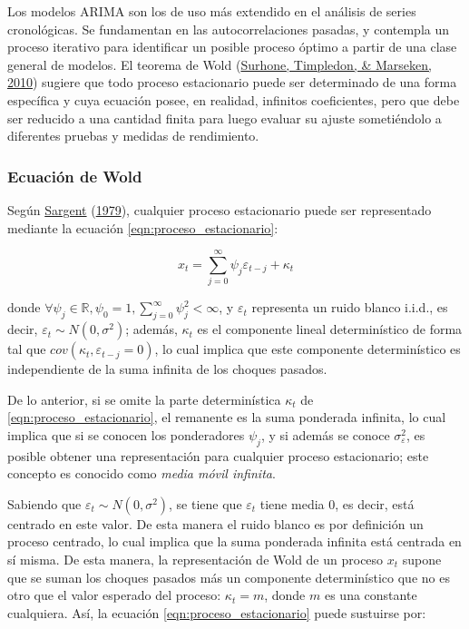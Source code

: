 \documentclass[
]{article}
\begin{document}
Los modelos ARIMA son los de uso más extendido en el análisis de series
cronológicas. Se fundamentan en las autocorrelaciones pasadas, y
contempla un proceso iterativo para identificar un posible proceso
óptimo a partir de una clase general de modelos. El teorema de Wold
(\protect\hyperlink{ref-Wold}{Surhone, Timpledon, \& Marseken, 2010})
sugiere que todo proceso estacionario puede ser determinado de una forma
específica y cuya ecuación posee, en realidad, infinitos coeficientes,
pero que debe ser reducido a una cantidad finita para luego evaluar su
ajuste sometiéndolo a diferentes pruebas y medidas de rendimiento.

\subsubsection{Ecuación de Wold}

Según \protect\hyperlink{ref-sargent_macro}{Sargent}
(\protect\hyperlink{ref-sargent_macro}{1979}), cualquier proceso
estacionario puede ser representado mediante la ecuación
\ref{eqn:proceso_estacionario}:

\begin{equation}
\label{eqn:proceso_estacionario}
x_t=\sum_{j=0}^{\infty} \psi_j\varepsilon_{t-j}+\kappa_t
\end{equation}

donde
\(\forall \psi_j \in \mathbb{R}, \psi_0=1, \sum_{j=0}^{\infty} \psi_j^2<\infty\),
y \(\varepsilon_t\) representa un ruido blanco i.i.d., es decir,
\(\varepsilon_t \sim N(0, \sigma^2)\); además, \(\kappa_t\) es el
componente lineal determinístico de forma tal que
\(cov(\kappa_t,\varepsilon_{t-j}=0)\), lo cual implica que este
componente determinístico es independiente de la suma infinita de los
choques pasados.

De lo anterior, si se omite la parte determinística \(\kappa_t\) de
\ref{eqn:proceso_estacionario}, el remanente es la suma ponderada
infinita, lo cual implica que si se conocen los ponderadores \(\psi_j\),
y si además se conoce \(\sigma_\varepsilon^2\), es posible obtener una
representación para cualquier proceso estacionario; este concepto es
conocido como \emph{media móvil infinita}.

Sabiendo que \(\varepsilon_t \sim N(0, \sigma^2)\), se tiene que
\(\varepsilon_t\) tiene media 0, es decir, está centrado en este valor.
De esta manera el ruido blanco es por definición un proceso centrado, lo
cual implica que la suma ponderada infinita está centrada en sí misma.
De esta manera, la representación de Wold de un proceso \(x_t\) supone
que se suman los choques pasados más un componente determinístico que no
es otro que el valor esperado del proceso: \(\kappa_t=m\), donde \(m\)
es una constante cualquiera. Así, la ecuación
\ref{eqn:proceso_estacionario} puede sustuirse por:
\end{document}
